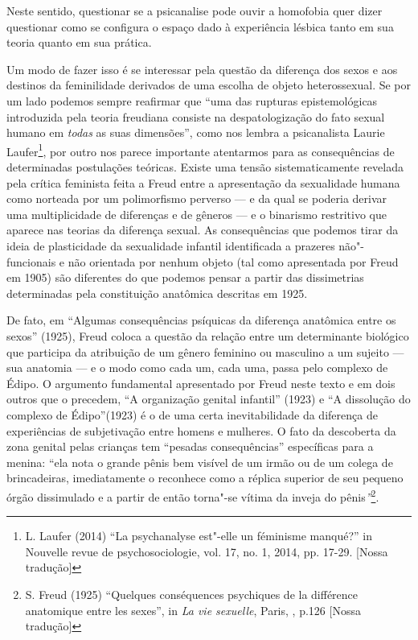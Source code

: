 Neste sentido, questionar se a psicanalise pode ouvir a homofobia quer
dizer questionar como se configura o espaço dado à experiência lésbica
tanto em sua teoria quanto em sua prática.

Um modo de fazer isso é se interessar pela questão da diferença dos
sexos e aos destinos da feminilidade derivados de uma escolha de objeto
heterossexual. Se por um lado podemos sempre reafirmar que ``uma das
rupturas epistemológicas introduzida pela teoria freudiana consiste na
despatologização do fato sexual humano em \emph{todas} as suas
dimensões'', como nos lembra a psicanalista Laurie Laufer\footnote{L.
  Laufer (2014) ``La psychanalyse est"-elle un féminisme manqué?'' in
  Nouvelle revue de psychosociologie, vol. 17, no. 1, 2014, pp. 17-29.
  {[}Nossa tradução{]}}, por outro nos parece importante atentarmos para
as consequências de determinadas postulações teóricas. Existe uma tensão
sistematicamente revelada pela crítica feminista feita a Freud entre a
apresentação da sexualidade humana como norteada por um polimorfismo
perverso --- e da qual se poderia derivar uma multiplicidade de
diferenças e de gêneros --- e o binarismo restritivo que aparece nas
teorias da diferença sexual. As consequências que podemos tirar da ideia
de plasticidade da sexualidade infantil identificada a prazeres
não"-funcionais e não orientada por nenhum objeto (tal como apresentada
por Freud em 1905) são diferentes do que podemos pensar a partir das
dissimetrias determinadas pela constituição anatômica descritas em 1925.

De fato, em ``Algumas consequências psíquicas da diferença anatômica
entre os sexos'' (1925), Freud coloca a questão da relação entre um
determinante biológico que participa da atribuição de um gênero feminino
ou masculino a um sujeito --- sua anatomia --- e o modo como cada um, cada
uma, passa pelo complexo de Édipo. O argumento fundamental apresentado
por Freud neste texto e em dois outros que o precedem, ``A organização
genital infantil'' (1923) e ``A dissolução do complexo de Édipo''(1923)
é o de uma certa inevitabilidade da diferença de experiências de
subjetivação entre homens e mulheres. O fato da descoberta da zona
genital pelas crianças tem ``pesadas consequências'' específicas para a
menina: ``ela nota o grande pênis bem visível de um irmão ou de um
colega de brincadeiras, imediatamente o reconhece como a réplica
superior de seu pequeno órgão dissimulado e a partir de então torna"-se
vítima da inveja do pênis\emph{''}\footnote{S. Freud (1925) ``Quelques
  conséquences psychiques de la différence anatomique entre les sexes'',
  in \emph{La vie sexuelle}, Paris, , p.126 {[}Nossa tradução{]}}.

